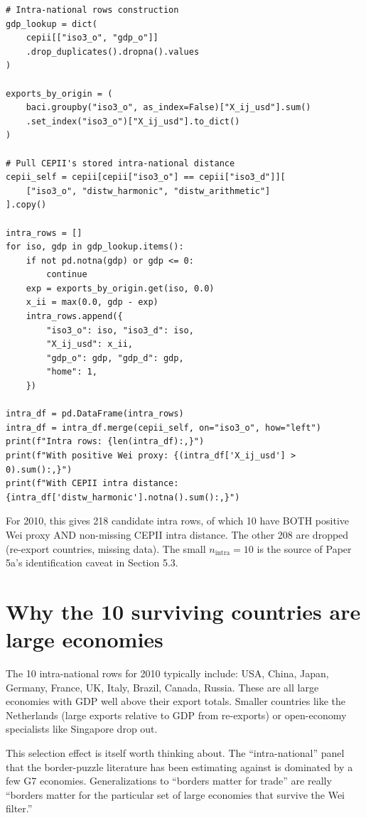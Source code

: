 \documentclass[11pt,letterpaper,oneside]{book}
\theoremstyle{definition}
\theoremstyle{remark}
\begin{document}
\begin{worked}
\begin{lstlisting}
# Intra-national rows construction
gdp_lookup = dict(
    cepii[["iso3_o", "gdp_o"]]
    .drop_duplicates().dropna().values
)

exports_by_origin = (
    baci.groupby("iso3_o", as_index=False)["X_ij_usd"].sum()
    .set_index("iso3_o")["X_ij_usd"].to_dict()
)

# Pull CEPII's stored intra-national distance
cepii_self = cepii[cepii["iso3_o"] == cepii["iso3_d"]][
    ["iso3_o", "distw_harmonic", "distw_arithmetic"]
].copy()

intra_rows = []
for iso, gdp in gdp_lookup.items():
    if not pd.notna(gdp) or gdp <= 0:
        continue
    exp = exports_by_origin.get(iso, 0.0)
    x_ii = max(0.0, gdp - exp)
    intra_rows.append({
        "iso3_o": iso, "iso3_d": iso,
        "X_ij_usd": x_ii,
        "gdp_o": gdp, "gdp_d": gdp,
        "home": 1,
    })

intra_df = pd.DataFrame(intra_rows)
intra_df = intra_df.merge(cepii_self, on="iso3_o", how="left")
print(f"Intra rows: {len(intra_df):,}")
print(f"With positive Wei proxy: {(intra_df['X_ij_usd'] > 0).sum():,}")
print(f"With CEPII intra distance: {intra_df['distw_harmonic'].notna().sum():,}")
\end{lstlisting}

For 2010, this gives 218 candidate intra rows, of which 10 have BOTH
positive Wei proxy AND non-missing CEPII intra distance. The other
208 are dropped (re-export countries, missing data). The small
$n_{\text{intra}} = 10$ is the source of Paper 5a's identification
caveat in Section 5.3.
\end{worked}

\section{Why the 10 surviving countries are large economies}

The 10 intra-national rows for 2010 typically include: USA, China,
Japan, Germany, France, UK, Italy, Brazil, Canada, Russia. These are
all large economies with GDP well above their export totals. Smaller
countries like the Netherlands (large exports relative to GDP from
re-exports) or open-economy specialists like Singapore drop out.

This selection effect is itself worth thinking about. The
``intra-national'' panel that the border-puzzle literature has been
estimating against is dominated by a few G7 economies. Generalizations
to ``borders matter for trade'' are really ``borders matter for the
particular set of large economies that survive the Wei filter.''
\end{document}
